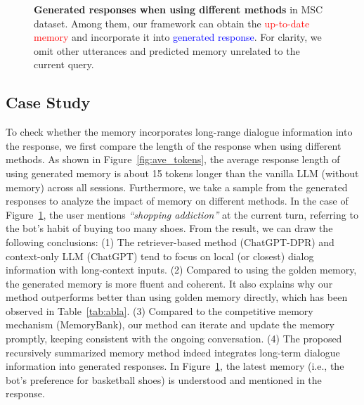 \documentclass[authoryear,preprint,review,12pt]{elsarticle}
\begin{document}
\begin{figure}[t]
  \centering
  \caption{\textbf{Generated responses when using different methods} in MSC dataset. Among them, our framework can obtain the \textcolor{red}{up-to-date memory} and incorporate it into \textcolor{blue}{generated response}. For clarity, we omit other utterances and predicted memory unrelated to the current query.}
  \label{fig:case}
\end{figure}
\subsection{Case Study}
\label{sec:ana_resp}
To check whether the memory incorporates long-range dialogue information into the response, we first compare the length of the response when using different methods. As shown in Figure~\ref{fig:ave_tokens}, the average response length of using generated memory is about 15 tokens longer than the vanilla LLM (without memory) across all sessions. Furthermore, we take a sample from the generated responses to analyze the impact of memory on different methods. In the case of Figure~\ref{fig:case}, the user mentions \textit{``shopping addiction''} at the current turn, referring to the bot's habit of buying too many shoes. From the result, we can draw the following conclusions: (1) The retriever-based method (ChatGPT-DPR) and context-only LLM (ChatGPT) tend to focus on local (or closest) dialog information with long-context inputs. (2) Compared to using the golden memory, the generated memory is more fluent and coherent. It also explains why our method outperforms better than using golden memory directly, which has been observed in Table~\ref{tab:abla}. (3) Compared to the competitive memory mechanism (MemoryBank), our method can iterate and update the memory promptly, keeping consistent with the ongoing conversation.
(4) The proposed recursively summarized memory method indeed integrates long-term dialogue information into generated responses. In Figure~\ref{fig:case}, the latest memory (i.e., the bot's preference for basketball shoes) is understood and mentioned in the response.
\end{document}

